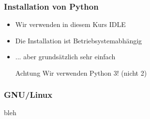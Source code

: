 \documentclass{beamer}
\begin{document}
\begin{frame}
\frametitle {Installation von Python}

\begin{itemize}
	\item Wir verwenden in diesem Kurs IDLE
	\item Die Installation ist Betriebsystemabhängig
	\item ... aber grundsätzlich sehr einfach

	\begin{alertblock}{Achtung}
		Wir verwenden Python 3! (nicht 2)
	\end{alertblock}
\end{itemize}
\end{frame}

\begin{frame}
\frametitle {GNU/Linux}
	bleh
\end{frame}
\end{document}
